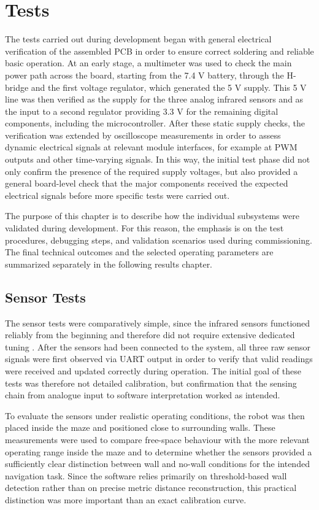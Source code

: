 \section{Tests}

The tests carried out during development began with general electrical verification of the assembled PCB in order to ensure correct soldering and reliable basic operation. At an early stage, a multimeter was used to check the main power path across the board, starting from the 7.4 V battery, through the H-bridge and the first voltage regulator, which generated the 5 V supply. This 5 V line was then verified as the supply for the three analog infrared sensors and as the input to a second regulator providing 3.3 V for the remaining digital components, including the microcontroller. After these static supply checks, the verification was extended by oscilloscope measurements in order to assess dynamic electrical signals at relevant module interfaces, for example at PWM outputs and other time-varying signals. In this way, the initial test phase did not only confirm the presence of the required supply voltages, but also provided a general board-level check that the major components received the expected electrical signals before more specific tests were carried out.

The purpose of this chapter is to describe how the individual subsystems were validated during development. For this reason, the emphasis is on the test procedures, debugging steps, and validation scenarios used during commissioning. The final technical outcomes and the selected operating parameters are summarized separately in the following results chapter.

\subsection{Sensor Tests}

The sensor tests were comparatively simple, since the infrared sensors functioned reliably from the beginning and therefore did not require extensive dedicated tuning \cite{datasheet_sensor}. After the sensors had been connected to the system, all three raw sensor signals were first observed via UART output in order to verify that valid readings were received and updated correctly during operation. The initial goal of these tests was therefore not detailed calibration, but confirmation that the sensing chain from analogue input to software interpretation worked as intended.

To evaluate the sensors under realistic operating conditions, the robot was then placed inside the maze and positioned close to surrounding walls. These measurements were used to compare free-space behaviour with the more relevant operating range inside the maze and to determine whether the sensors provided a sufficiently clear distinction between wall and no-wall conditions for the intended navigation task. Since the software relies primarily on threshold-based wall detection rather than on precise metric distance reconstruction, this practical distinction was more important than an exact calibration curve.


